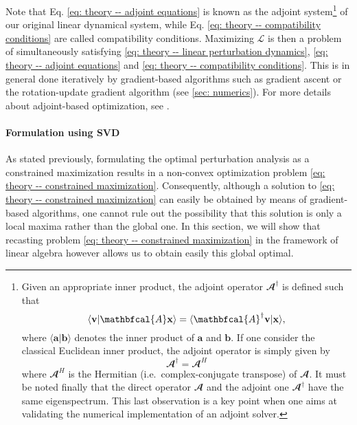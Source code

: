       Note that Eq. \eqref{eq: theory -- adjoint equations} is known as the adjoint system\footnote{
      Given an appropriate inner product, the adjoint operator $\mathbfcal{A}^{\dagger}$ is defined such that
      \begin{equation}
        \langle \mathbf{v} \vert \mathbfcal{A} \mathbf{x} \rangle = \langle \mathbfcal{A}^{\dagger} \mathbf{v} \vert \mathbf{x} \rangle,
        \notag
      \end{equation}
      where $\langle \mathbf{a} \vert \mathbf{b} \rangle$ denotes the inner product of $\mathbf{a}$ and $\mathbf{b}$. If one consider the classical Euclidean inner product, the adjoint operator is simply given by
      $$\mathbfcal{A}^{\dagger} = \mathbfcal{A}^H$$
      where $\mathbfcal{A}^H$ is the Hermitian (i.e.\ complex-conjugate transpose) of $\mathbfcal{A}$. It must be noted finally that the direct operator $\mathbfcal{A}$ and the adjoint one $\mathbfcal{A}^{\dagger}$ have the same eigenspectrum. This last observation is a key point when one aims at validating the numerical implementation of an adjoint solver.
      }
      of our original linear dynamical system, while Eq. \eqref{eq: theory -- compatibility conditions} are called compatibility conditions. Maximizing $\mathcal{L}$ is then a problem of simultaneously satisfying \eqref{eq: theory -- linear perturbation dynamics}, \eqref{eq: theory -- adjoint equations} and \eqref{eq: theory -- compatibility conditions}. This is in general done iteratively by gradient-based algorithms such as gradient ascent or the rotation-update gradient algorithm (see \textsection \ref{sec: numerics}). For more details about adjoint-based optimization, see \cite{book:boyd:2004, nonlinear_optimal:kerswell:2014}.

      \paragraph{Formulation using SVD}
      \label{paragraph: theory -- optimal perturbation svd}

      As stated previously, formulating the optimal perturbation analysis as a constrained maximization results in a non-convex optimization problem \eqref{eq: theory -- constrained maximization}. Consequently, although a solution to \eqref{eq: theory -- constrained maximization} can easily be obtained by means of gradient-based algorithms, one cannot rule out the possibility that this solution is only a local maxima rather than the global one. In this section, we will show that recasting problem \eqref{eq: theory -- constrained maximization} in the framework of linear algebra however allows us to obtain easily this global optimal.

